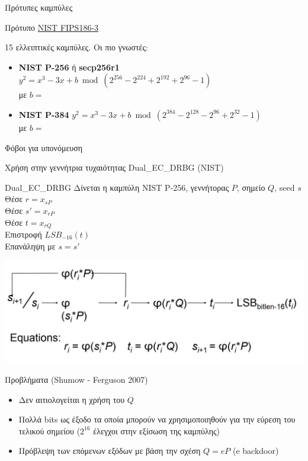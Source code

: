 \documentclass[handout]{beamer}
\begin{document}
\begin{frame}[allowframebreaks]{Πρότυπες καμπύλες}
\begin{block}{Πρότυπο \href{http://csrc.nist.gov/publications/fips/fips186-3/fips_186-3.pdf}{NIST FIPS186-3}}

15 ελλειπτικές καμπύλες. Οι πιο γνωστές:

\begin{itemize}  
\item \textbf{NIST P-256} ή \textbf{secp256r1} 
$y^2 = x^3-3x+b \bmod ( 2^{256} - 2^{224} + 2^{192} + 2^{96} - 1)$\\
με $b=$\\
\item \textbf{NIST P-384 }
$y^2 = x^3-3x+b \bmod (2^{384}- 2^{128} - 2^{96} + 2^{32} - 1)$\\
με $b=$\\
\end{itemize} 

\alert{Φόβοι για υπονόμευση}
\end{block}

\framebreak
Χρήση στην γεννήτρια τυχαιότητας Dual\_EC\_DRBG (NIST)
\begin{block}{Dual\_EC\_DRBG}
Δίνεται η καμπύλη NIST P-256, γεννήτορας $P$, σημείο $Q$, seed $s$ \\
Θέσε $r = x_{sP}$ \\
Θέσε $s' = x_{rP}$ \\
Θέσε $t = x_{rQ}$ \\
Επιστροφή $LSB_{-16}(t)$\\
Επανάληψη με $s=s'$
\end{block}
\begin{center}
\includegraphics[scale=0.25]{Dual_EC_DRBG.png}
\end{center}
Προβλήματα (Shumow - Ferguson 2007)
\begin{itemize}
	\item Δεν αιτιολογείται η χρήση του $Q$
	\item Πολλά bits ως έξοδο τα οποία μπορούν να χρησιμοποιηθούν για την εύρεση του τελικού σημείου ($2^{16}$ έλεγχοι στην εξίσωση της καμπύλης)
	\item Πρόβλεψη των επόμενων εξόδων με βάση την σχέση $Q=eP$ (e backdoor)
\end{itemize}
 

\end{frame}
\end{document}
